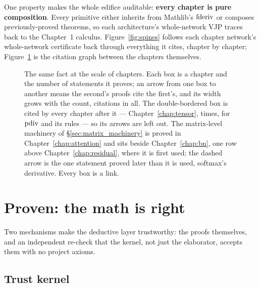 One property makes the whole edifice auditable: \textbf{every chapter is
pure composition}. Every primitive either inherits from Mathlib's
\(\operatorname{fderiv}\) or composes previously-proved theorems, so each
architecture's whole-network VJP traces back to the Chapter~1 calculus.
Figure~\ref{fig:spines} follows each chapter network's whole-network
certificate back through everything it cites, chapter by chapter;
Figure~\ref{fig:chapter_map} is the citation graph between the chapters
themselves.

\begin{figure}[ht]
\centering

\caption{The same fact at the scale of chapters. Each box is a chapter and
the number of statements it proves; an arrow from one box to another means
the second's proofs cite the first's, and its width grows with the count,
\depgraphCitations{} citations in all. The double-bordered box is cited by every
chapter after it --- Chapter~\ref{chap:tensor}, \depgraphCitesTensor{} times, for \(\operatorname{pdiv}\)
and its rules --- so its arrows are left out. The matrix-level machinery of
\S\ref{sec:matrix_machinery} is proved in Chapter~\ref{chap:attention}
and sits beside Chapter~\ref{chap:bn}, one row above Chapter~\ref{chap:residual}, where it is
first used; the dashed arrow is the one statement proved
later than it is used, softmax's derivative. Every box is a link.}
\label{fig:chapter_map}
\end{figure}

\section{Proven: the math is right}

Two mechanisms make the deductive layer trustworthy: the proofs
themselves, and an independent re-check that the kernel, not
just the elaborator, accepts them with no project axioms.

\subsection{Trust kernel}

